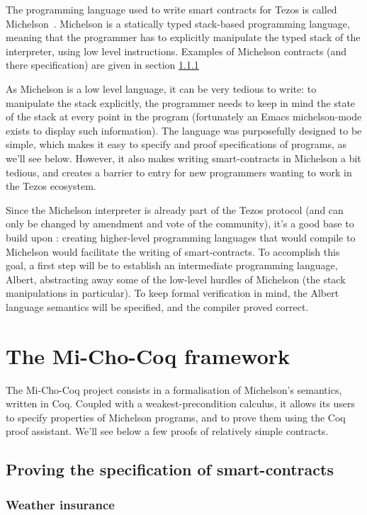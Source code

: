 \documentclass{report}
\begin{document}
The programming language used to write smart contracts for Tezos is called Michelson~\cite{michelsonwhitedoc}. Michelson is a statically typed stack-based programming language, meaning that the programmer has to explicitly manipulate the typed stack of the interpreter, using low level instructions. Examples of Michelson contracts (and there specification) are given in section \ref{contractsSpec}

As Michelson is a low level language, it can be very tedious to write: to manipulate the stack explicitly, the programmer needs to keep in mind the state of the stack at every point in the program (fortunately an Emacs michelson-mode exists to display such information). The language was purposefully designed to be simple, which makes it easy to specify and proof specifications of programs, as we'll see below. However, it also makes writing smart-contracts in Michelson a bit tedious, and creates a barrier to entry for new programmers wanting to work in the Tezos ecosystem.

Since the Michelson interpreter is already part of the Tezos protocol (and can only be changed by amendment and vote of the community), it's a good base to build upon : creating higher-level programming languages that would compile to Michelson would facilitate the writing of smart-contracts. To accomplish this goal, a first step will be to establish an intermediate programming language, Albert, abstracting away some of the low-level hurdles of Michelson (the stack manipulations in particular). To keep formal verification in mind, the Albert language semantics will be specified, and the compiler proved correct.

\chapter{The Mi-Cho-Coq framework}

The Mi-Cho-Coq project consists in a formalisation of Michelson's semantics, written in Coq. Coupled with a weakest-precondition calculus, it allows its users to specify properties of Michelson programs, and to prove them using the Coq proof assistant. We'll see below a few proofs of relatively simple contracts.

\section{Proving the specification of smart-contracts}

\subsection{Weather insurance}
\label{contractsSpec}
\end{document}
